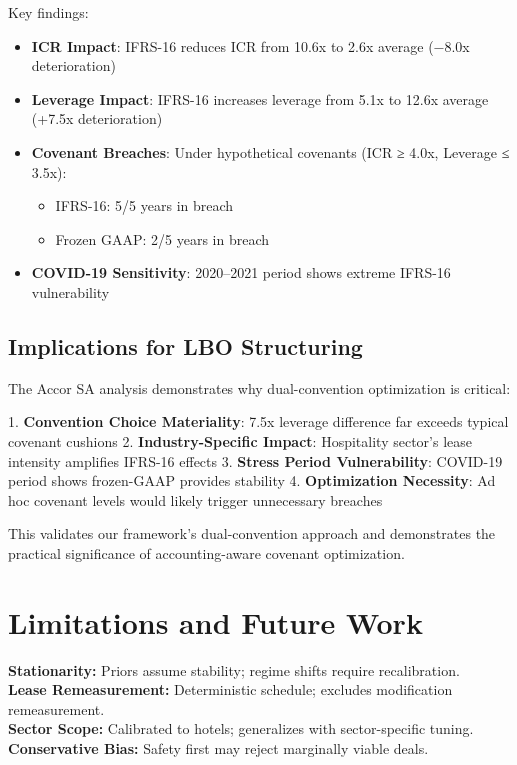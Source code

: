 \documentclass[11pt,a4paper]{article}
\theoremstyle{plain}
\theoremstyle{definition}
\begin{document}
Key findings:
\begin{itemize}
\item \textbf{ICR Impact}: IFRS-16 reduces ICR from 10.6x to 2.6x average (−8.0x deterioration)
\item \textbf{Leverage Impact}: IFRS-16 increases leverage from 5.1x to 12.6x average (+7.5x deterioration) 
\item \textbf{Covenant Breaches}: Under hypothetical covenants (ICR ≥ 4.0x, Leverage ≤ 3.5x):
  \begin{itemize}
  \item IFRS-16: 5/5 years in breach
  \item Frozen GAAP: 2/5 years in breach
  \end{itemize}
\item \textbf{COVID-19 Sensitivity}: 2020--2021 period shows extreme IFRS-16 vulnerability
\end{itemize}

\subsection{Implications for LBO Structuring}

The Accor SA analysis demonstrates why dual-convention optimization is critical:

1. \textbf{Convention Choice Materiality}: 7.5x leverage difference far exceeds typical covenant cushions
2. \textbf{Industry-Specific Impact}: Hospitality sector's lease intensity amplifies IFRS-16 effects  
3. \textbf{Stress Period Vulnerability}: COVID-19 period shows frozen-GAAP provides stability
4. \textbf{Optimization Necessity}: Ad hoc covenant levels would likely trigger unnecessary breaches

This validates our framework's dual-convention approach and demonstrates the practical significance of accounting-aware covenant optimization.

\section{Limitations and Future Work}

\textbf{Stationarity:} Priors assume stability; regime shifts require recalibration. \\
\textbf{Lease Remeasurement:} Deterministic schedule; excludes modification remeasurement. \\
\textbf{Sector Scope:} Calibrated to hotels; generalizes with sector-specific tuning. \\
\textbf{Conservative Bias:} Safety first may reject marginally viable deals.
\end{document}
